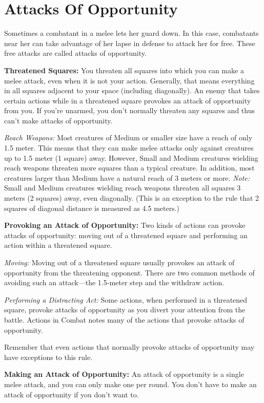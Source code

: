 \section{Attacks Of Opportunity}
Sometimes a combatant in a melee lets her guard down. In this case, combatants near her can take advantage of her lapse in defense to attack her for free. These free attacks are called attacks of opportunity.

\textbf{Threatened Squares:} You threaten all squares into which you can make a melee attack, even when it is not your action. Generally, that means everything in all squares adjacent to your space (including diagonally). An enemy that takes certain actions while in a threatened square provokes an attack of opportunity from you. If you're unarmed, you don't normally threaten any squares and thus can't make attacks of opportunity.

\textit{Reach Weapons:} Most creatures of Medium or smaller size have a reach of only 1.5 meter. This means that they can make melee attacks only against creatures up to 1.5 meter (1 square) away. However, Small and Medium creatures wielding reach weapons threaten more squares than a typical creature. In addition, most creatures larger than Medium have a natural reach of 3 meters or more. \emph{Note:} Small and Medium creatures wielding reach weapons threaten all squares 3 meters (2 squares) away, even diagonally. (This is an exception to the rule that 2 squares of diagonal distance is measured as 4.5 meters.)

\textbf{Provoking an Attack of Opportunity:} Two kinds of actions can provoke attacks of opportunity: moving out of a threatened square and performing an action within a threatened square.

\textit{Moving:} Moving out of a threatened square usually provokes an attack of opportunity from the threatening opponent. There are two common methods of avoiding such an attack---the 1.5-meter step and the withdraw action.

\textit{Performing a Distracting Act:} Some actions, when performed in a threatened square, provoke attacks of opportunity as you divert your attention from the battle. Actions in Combat notes many of the actions that provoke attacks of opportunity.

Remember that even actions that normally provoke attacks of opportunity may have exceptions to this rule.

\textbf{Making an Attack of Opportunity:} An attack of opportunity is a single melee attack, and you can only make one per round. You don't have to make an attack of opportunity if you don't want to.

